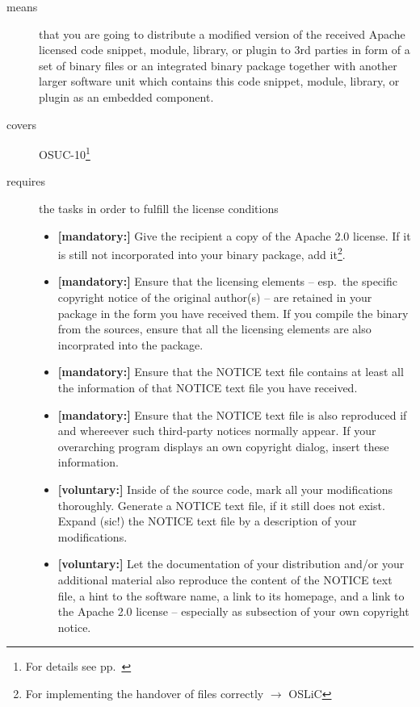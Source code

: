 \begin{description}
\item[means] that you are going to distribute a modified version of the received
Apache licensed code snippet, module, library, or plugin to 3rd parties in form
of a set of binary files or an integrated binary package together with another
larger software unit which contains this code snippet, module, library, or
plugin as an embedded component.
\item[covers] OSUC-10\footnote{For details see pp.\ \pageref{OSUC-10-DEF}}
\item[requires] the tasks in order to fulfill the license conditions
\begin{itemize}
  
  \item \textbf{[mandatory:]} Give the recipient a copy of the Apache 2.0
  license. If it is still not incorporated into your binary package, add
  it\footnote{For implementing the handover of files correctly $\rightarrow$
  OSLiC \pageref{DistributingFilesHint}}.
  
  \item \textbf{[mandatory:]} Ensure that the licensing elements -- esp.\ the
  specific copyright notice of the original author(s) -- are retained in your
  package in the form you have received them. If you compile the binary from the
  sources, ensure that all the licensing elements are also incorprated into the
  package.
  
  \item \textbf{[mandatory:]} Ensure that the NOTICE text file contains at least
  all the information of that NOTICE text file you have received.
 
  \item \textbf{[mandatory:]} Ensure that the NOTICE text file is also
  reproduced if and whereever such third-party notices normally appear. If your
  overarching program displays an own copyright dialog, insert these
  information.
     
  \item \textbf{[voluntary:]} Inside of the source code, mark all your
  modifications thoroughly. Generate a NOTICE text file, if it still does not
  exist. Expand (sic!) the NOTICE text file by a description of your
  modifications.
 
  \item \textbf{[voluntary:]} Let the documentation of your distribution
  and/or your additional material also reproduce the content of the NOTICE text
  file, a hint to the software name, a link to its homepage, and a link to the
  Apache 2.0 license -- especially as subsection of your own copyright notice.
  


\end{itemize}
\end{description}
